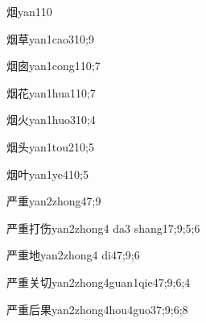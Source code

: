 \begin{verbete}{烟}{yan1}{10}
\end{verbete}

\begin{verbete}{烟草}{yan1cao3}{10;9}
\end{verbete}

\begin{verbete}{烟囱}{yan1cong1}{10;7}
\end{verbete}

\begin{verbete}{烟花}{yan1hua1}{10;7}
\end{verbete}

\begin{verbete}{烟火}{yan1huo3}{10;4}
\end{verbete}

\begin{verbete}{烟头}{yan1tou2}{10;5}
\end{verbete}

\begin{verbete}{烟叶}{yan1ye4}{10;5}
\end{verbete}

\begin{verbete}{严重}{yan2zhong4}{7;9}
\end{verbete}

\begin{verbete}{严重打伤}{yan2zhong4 da3 shang1}{7;9;5;6}
\end{verbete}

\begin{verbete}{严重地}{yan2zhong4 di4}{7;9;6}
\end{verbete}

\begin{verbete}{严重关切}{yan2zhong4guan1qie4}{7;9;6;4}
\end{verbete}

\begin{verbete}{严重后果}{yan2zhong4hou4guo3}{7;9;6;8}
\end{verbete}


